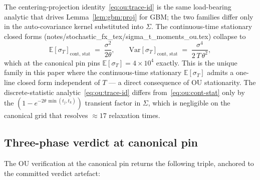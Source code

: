 \documentclass[11pt,letterpaper]{article}
\newcommand{\E}{\mathbb{E}}
\newcommand{\Var}{\text{Var}}
\newcommand{\sigmaT}{\sigma_{T}}
\begin{document}
The centering-projection identity~\eqref{eq:ou:trace-id} is the same
load-bearing analytic that drives Lemma~\ref{lem:gbm:proj} for GBM; the
two families differ only in the auto-covariance kernel substituted into
$\Sigma$. The continuous-time stationary closed forms
(\textsf{notes/stochastic\_fx\_tex/sigma\_t\_moments\_ou.tex}) collapse
to
\begin{equation}
    \E[\sigmaT]_{\text{cont, stat}}
    \;=\;
    \frac{\sigma^{2}}{2\theta},
    \qquad
    \Var[\sigmaT]_{\text{cont, stat}}
    \;=\;
    \frac{\sigma^{4}}{2\,T\,\theta^{2}},
    \label{eq:ou:cont-stat}
\end{equation}
which at the canonical pin pins $\E[\sigmaT] = 4 \times 10^{4}$ exactly.
This is the unique family in this paper where the continuous-time
stationary $\E[\sigmaT]$ admits a one-line closed form independent of $T$
— a direct consequence of OU stationarity. The discrete-statistic
analytic~\eqref{eq:ou:trace-id} differs from~\eqref{eq:ou:cont-stat} only
by the $(1 - e^{-2\theta\,\min(t_{j}, t_{k})})$ transient factor in
$\Sigma$, which is negligible on the canonical grid that resolves
$\approx 17$ relaxation times.

\subsection{Three-phase verdict at canonical pin}
\label{sec:ou:verdict}

The OU verification at the canonical pin returns the following triple,
anchored to the committed verdict artefact:
\end{document}
